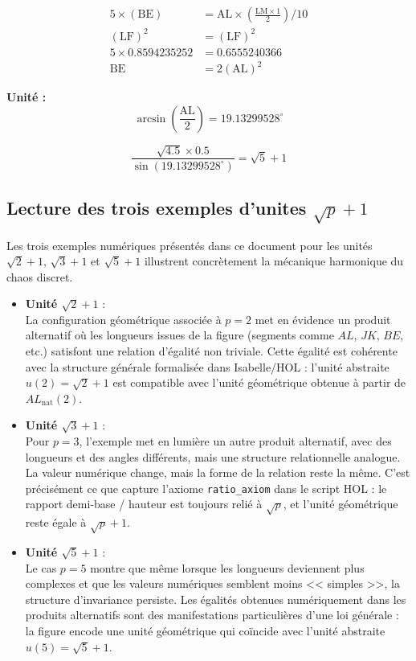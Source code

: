 \documentclass[12pt,a4paper]{article}
\theoremstyle{definition}
\theoremstyle{remark}
\begin{document}
\begin{align}
5 \times (\mathrm{BE}) &= \mathrm{AL} \times \left(\frac{\mathrm{LM} \times 1}{2}\right) / 10 \\
(\mathrm{LF})^{2} &= (\mathrm{LF})^{2} \\
5 \times 0.8594235252 &= 0.6555240366 \\
\mathrm{BE} &= 2(\mathrm{AL})^{2}
\end{align}

\noindent\textbf{Unité :}
\[
\arcsin\left(\frac{\mathrm{AL}}{2}\right) = 19.13299528^\circ
\]

\[
\frac{\sqrt{4.5} \times 0.5}{\sin(19.13299528^\circ)} = \sqrt{5} + 1
\]

\subsection{Lecture des trois exemples d'unites \texorpdfstring{$\sqrt{p} + 1$}{sqrt(p)+1}}

Les trois exemples numériques présentés dans ce document pour les unités
$\sqrt{2} + 1$, $\sqrt{3} + 1$ et $\sqrt{5} + 1$ illustrent concrètement
la mécanique harmonique du chaos discret.

\begin{itemize}
  \item \textbf{Unité $\sqrt{2} + 1$} :\\
  La configuration géométrique associée à $p = 2$ met en évidence un produit
  alternatif où les longueurs issues de la figure (segments comme $AL$, $JK$,
  $BE$, etc.) satisfont une relation d'égalité non triviale. Cette égalité
  est cohérente avec la structure générale formalisée dans Isabelle/HOL :
  l'unité abstraite $u(2) = \sqrt{2} + 1$ est compatible avec l'unité
  géométrique obtenue à partir de $AL_{\text{nat}}(2)$.

  \item \textbf{Unité $\sqrt{3} + 1$} :\\
  Pour $p = 3$, l'exemple met en lumière un autre produit alternatif, avec
  des longueurs et des angles différents, mais une structure relationnelle
  analogue. La valeur numérique change, mais la forme de la relation reste
  la même. C'est précisément ce que capture l'axiome
  \texttt{ratio\_axiom} dans le script HOL : le rapport demi-base / hauteur
  est toujours relié à $\sqrt{p}$, et l'unité géométrique reste égale à
  $\sqrt{p} + 1$.

  \item \textbf{Unité $\sqrt{5} + 1$} :\\
  Le cas $p = 5$ montre que même lorsque les longueurs deviennent plus
  complexes et que les valeurs numériques semblent moins << simples >>, la
  structure d'invariance persiste. Les égalités obtenues numériquement
  dans les produits alternatifs sont des manifestations particulières
  d'une loi générale : la figure encode une unité géométrique qui coïncide
  avec l'unité abstraite $u(5) = \sqrt{5} + 1$.
\end{itemize}
\end{document}
